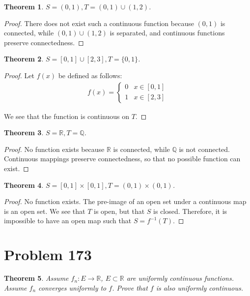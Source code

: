 \documentclass[psamsfonts]{amsart}
\newtheorem{thm}{Theorem}[section]
\theoremstyle{definition}
\theoremstyle{remark}
\numberwithin{equation}{section}
\begin{document}
\begin{thm}
$S = (0,1), T = (0,1) \cup (1,2)$.
\end{thm}

\begin{proof}
There does not exist such a continuous function because $(0,1)$ is connected, while $(0,1) \cup (1,2)$ is separated, and continuous functions preserve connectedness. 
\end{proof}

\begin{thm}
$S = [0,1] \cup [2,3], T = \{0, 1 \}$.
\end{thm}

\begin{proof}
Let $f(x)$ be defined as follows:
\begin{eqnarray}
f(x) = \left\{ \begin{array}{ll}
0 & x \in [0,1] \\
1 & x \in [2,3] 
\end{array} \right.
\end{eqnarray}

We see that the function is continuous on $T$. 
\end{proof}

\begin{thm}
$S = \mathbb{R}, T = \mathbb{Q}$. 
\end{thm}

\begin{proof}
No function exists because $\mathbb{R}$ is connected, while $\mathbb{Q}$ is not connected. Continuous mappings preserve connectedness, so that no possible function can exist. 
\end{proof}

\begin{thm}
$S = [0,1] \times [0,1], T = (0,1) \times (0,1)$. 
\end{thm}

\begin{proof}
No function exists. The pre-image of an open set under a continuous map is an open set. We see that $T$ is open, but that $S$ is closed. Therefore, it is impossible to have an open map such that $S = f^{-1}(T)$. 
\end{proof}

\section{Problem 173}

\begin{thm}
Assume $f_n: E \to \mathbb{R}$, $E \subset \mathbb{R}$ are uniformly continuous functions. Assume $f_n$ converges uniformly to $f$. Prove that $f$ is also uniformly continuous. 
\end{thm}
\end{document}
